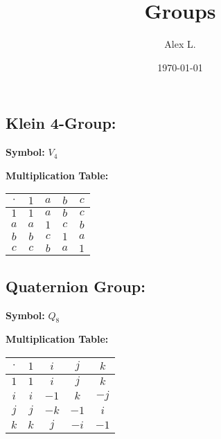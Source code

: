 \documentclass{article}
\title{Groups}
\author{Alex L.}
\date{\today}
\begin{document}
\maketitle

\subsection{Klein 4-Group:} 
\textbf{Symbol:} $V_4$

\textbf{Multiplication Table:}  

\begin{tabular}{c|cccc}
    $\cdot$ & $1$ & $a$ & $b$ & $c$ \\
    \hline
    $1$ & $1$ & $a$ & $b$ & $c$ \\
    $a$ & $a$ & $1$ & $c$ & $b$ \\
    $b$ & $b$ & $c$ & $1$ & $a$ \\
    $c$ & $c$ & $b$ & $a$ & $1$
\end{tabular}

\subsection{Quaternion Group:}
\textbf{Symbol:} $Q_8$

\textbf{Multiplication Table:} 

\begin{tabular}{c|cccc}
  $\cdot$  & $1$ & $i$ & $j$ & $k$ \\
    \hline
   $1$ & $1$ & $i$ & $j$ & $k$ \\
   $i$ & $i$ & $-1$ & $k$ & $-j$ \\
   $j$ & $j$ & $-k$ & $-1$ & $i$ \\
   $k$ & $k$ & $j$ & $-i$ & $-1$

\end{tabular}
\end{document}
